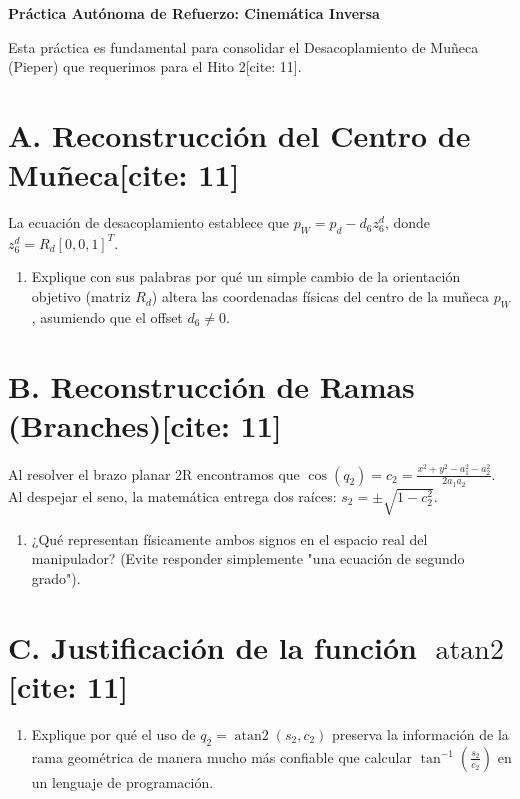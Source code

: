 \documentclass[11pt, a4paper]{article}
\begin{document}
\begin{center}
    \Large\textbf{\textcolor{ucbblue}{Práctica Autónoma de Refuerzo: Cinemática Inversa}}\\[0.2cm]
\end{center}

\begin{tcolorbox}[colback=yellow!10, colframe=black, title=\textbf{Nota del Docente}]
    Esta práctica es fundamental para consolidar el Desacoplamiento de Muñeca (Pieper) que requerimos para el Hito 2[cite: 11].
\end{tcolorbox}

\section*{A. Reconstrucción del Centro de Muñeca[cite: 11]}
La ecuación de desacoplamiento establece que $p_W = p_d - d_6 z_6^d$, donde $z_6^d = R_d [0, 0, 1]^T$.
\begin{enumerate}
    \item Explique con sus palabras por qué un simple cambio de la orientación objetivo (matriz $R_d$) altera las coordenadas físicas del centro de la muñeca $p_W$, asumiendo que el offset $d_6 \neq 0$.
\end{enumerate}

\vspace{2cm}

\section*{B. Reconstrucción de Ramas (Branches)[cite: 11]}
Al resolver el brazo planar 2R encontramos que $\cos(q_2) = c_2 = \frac{x^2+y^2-a_1^2-a_2^2}{2a_1 a_2}$.
Al despejar el seno, la matemática entrega dos raíces: $s_2 = \pm\sqrt{1-c_2^2}$.
\begin{enumerate}
    \item ¿Qué representan físicamente ambos signos en el espacio real del manipulador? (Evite responder simplemente "una ecuación de segundo grado").
\end{enumerate}

\vspace{2cm}

\section*{C. Justificación de la función $\operatorname{atan2}$[cite: 11]}
\begin{enumerate}
    \item Explique por qué el uso de $q_2 = \operatorname{atan2}(s_2, c_2)$ preserva la información de la rama geométrica de manera mucho más confiable que calcular $\tan^{-1}\left(\frac{s_2}{c_2}\right)$ en un lenguaje de programación.
\end{enumerate}
\end{document}
